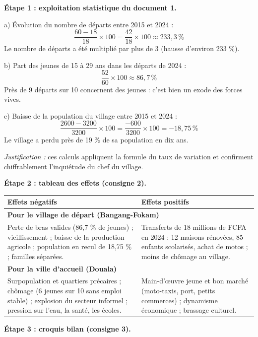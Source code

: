 \documentclass[11pt]{article}
\newcommand{\cle}[1]{{\popxbold\color{popdark}#1}}
\begin{document}
\begin{exoresolu}
\textbf{Étape 1 : exploitation statistique du document 1.}

a) Évolution du nombre de départs entre 2015 et 2024 :
\[ \frac{60 - 18}{18} \times 100 = \frac{42}{18} \times 100 \approx 233{,}3\,\% \]
Le nombre de départs a été multiplié par plus de 3 (hausse d'environ 233 \%).

b) Part des jeunes de 15 à 29 ans dans les départs de 2024 :
\[ \frac{52}{60} \times 100 \approx 86{,}7\,\% \]
Près de 9 départs sur 10 concernent des jeunes : c'est bien un \cle{exode des forces vives}.

c) Baisse de la population du village entre 2015 et 2024 :
\[ \frac{2600 - 3200}{3200} \times 100 = \frac{-600}{3200} \times 100 = -18{,}75\,\% \]
Le village a perdu près de 19 \% de sa population en dix ans.

\emph{Justification :} ces calculs appliquent la formule du taux de variation et confirment chiffrablement l'inquiétude du chef du village.

\tcblower

\textbf{Étape 2 : tableau des effets (consigne 2).}

\begin{center}
\begin{tabularx}{\linewidth}{|X|X|}\hline
\rowcolor{popblueL} \textbf{Effets négatifs} & \textbf{Effets positifs} \\ \hline
\multicolumn{2}{|l|}{\textbf{Pour le village de départ (Bangang-Fokam)}} \\ \hline
Perte de bras valides (86,7 \% de jeunes) ; vieillissement ; baisse de la production agricole ; population en recul de 18,75 \% ; familles séparées. & Transferts de 18 millions de FCFA en 2024 : 12 maisons rénovées, 85 enfants scolarisés, achat de motos ; moins de chômage au village. \\ \hline
\multicolumn{2}{|l|}{\textbf{Pour la ville d'accueil (Douala)}} \\ \hline
Surpopulation et quartiers précaires ; chômage (6 jeunes sur 10 sans emploi stable) ; explosion du secteur informel ; pression sur l'eau, la santé, les écoles. & Main-d'œuvre jeune et bon marché (moto-taxis, port, petits commerces) ; dynamisme économique ; brassage culturel. \\ \hline
\end{tabularx}
\end{center}

\textbf{Étape 3 : croquis bilan (consigne 3).}


\end{exoresolu}
\end{document}
